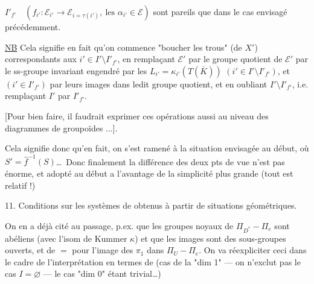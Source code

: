 
\(I'_{f'}\quad (f_{i'}:\mathcal E_{i'}\longrightarrow
\mathcal E_{i=\tau(i')},\ \text{les }\alpha_{i'}\in\mathcal E)\)
sont pareils que dans le cas envisagé précédemment.

\uline{NB} Cela signifie en fait qu'on commence  "boucher les trous" 
(de \(X'\)) correspondants aux \(i'\in I'\setminus I'_{f'}\), en remplaçant
\(\mathcal E'\) par le groupe quotient de \(\mathcal E'\)
par le ss-groupe invariant engendré par les
\(L_{i'}=\kappa_{i'}(T(\overline K))\)
\((i'\in I'\setminus I'_{f'})\), et  
\((i'\in I'_{f'})\) par leurs images dans ledit groupe quotient, et en oubliant
 \(I'\setminus I'_{f'}\), i.e. remplaçant \(I'\) par \(I'_{f'}\).

[Pour bien faire, il faudrait exprimer ces opérations aussi au niveau des diagrammes
de groupoïdes
\(\ldots\)].


Cela signifie donc qu'en fait, on s'est ramené à la situation envisagée au début,
où \(S'=\widehat f^{-1}(S)\)\ldots\ Donc finalement
la différence des deux pts de vue n'est pas énorme, et
 adopté au début a l'avantage de
la simplicité plus grande (tout est relatif !)



11. Conditions sur les systèmes de 
obtenus à partir de situations géométriques.

On en a déjà cité au passage, p.ex. que les groupes noyaux de
\(\Pi_{D^*}-\Pi_e\) sont abéliens (avec l'isom de Kummer \(\kappa\))
et que les images sont des sous-groupes ouverts, et de \(=\) pour
l'image des  \(\pi_1\) dans \(\Pi_U-\Pi_e\).
On va réexpliciter  ceci dans le cadre de l'interprétation
en termes de
(cas de la "dim 1" --- on n'exclut pas le cas \(I=\varnothing\) ---
le cas "dim 0" étant trivial\ldots)

